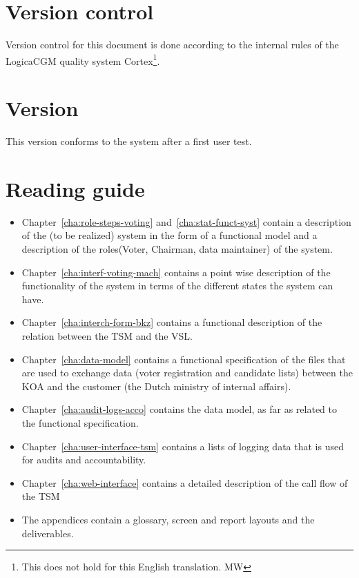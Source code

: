 \section{Version control}\label{sec1:version-control}

Version control for this document is done according to the internal rules
of the LogicaCGM quality system Cortex\footnote{This does not hold for
this English translation. MW}.

\section{Version}\label{sec1:version}

This version conforms to the system after a first user test.

\section{Reading guide}\label{sec1:read-guide}

\begin{itemize}
	\item Chapter~\ref{cha:role-steps-voting}
	and~\ref{cha:stat-funct-syst} contain a description of the (to
	be realized) system in the form of a functional model and a
	description of the roles(Voter, Chairman, data maintainer) of
	the system.  

	\item Chapter~\ref{cha:interf-voting-mach} contains a point
	wise description of the functionality of the system in terms
	of the different states the system can have.

	\item Chapter~\ref{cha:interch-form-bkz} contains a functional
	description of the relation between the TSM and the VSL.

	\item Chapter~\ref{cha:data-model} contains a functional
	specification of the files that are used to exchange data
	(voter registration and candidate lists) between the KOA and
	the customer (the Dutch ministry of internal affairs).

	\item Chapter~\ref{cha:audit-logs-acco} contains the data
	model, as far as related to the functional specification.

	\item Chapter~\ref{cha:user-interface-tsm} contains a lists of
	logging data that is used for audits and accountability.

	\item Chapter~\ref{cha:web-interface} contains a detailed
	description of the call flow of the TSM

	\item The appendices contain a glossary, screen and report
	layouts and the deliverables.
\end{itemize}

